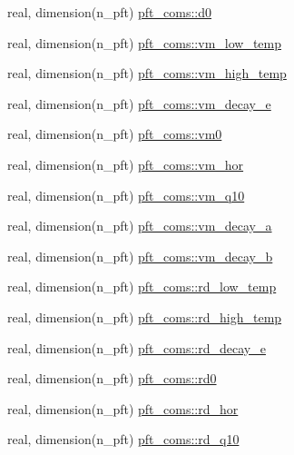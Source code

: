 \begin{DoxyCompactItemize}
real, dimension(n\+\_\+pft) \hyperlink{namespacepft__coms_aafd962aec98e7e8c1cfefd6543409bd5}{pft\+\_\+coms\+::d0}
\item 
real, dimension(n\+\_\+pft) \hyperlink{namespacepft__coms_abc805ab81f6ae61cf4ccfb36fd352fdc}{pft\+\_\+coms\+::vm\+\_\+low\+\_\+temp}
\item 
real, dimension(n\+\_\+pft) \hyperlink{namespacepft__coms_a847c455daab9b125944dd2057d418b6c}{pft\+\_\+coms\+::vm\+\_\+high\+\_\+temp}
\item 
real, dimension(n\+\_\+pft) \hyperlink{namespacepft__coms_a05c121e99b033c3fa874fc7ffd66fad3}{pft\+\_\+coms\+::vm\+\_\+decay\+\_\+e}
\item 
real, dimension(n\+\_\+pft) \hyperlink{namespacepft__coms_a80a6462c48a36d9c1ab7bcf0b6296702}{pft\+\_\+coms\+::vm0}
\item 
real, dimension(n\+\_\+pft) \hyperlink{namespacepft__coms_a1424943ac59ffe1e85af3d7eeca315bb}{pft\+\_\+coms\+::vm\+\_\+hor}
\item 
real, dimension(n\+\_\+pft) \hyperlink{namespacepft__coms_a47018d91ecb1fe0c547ec131348e5fdd}{pft\+\_\+coms\+::vm\+\_\+q10}
\item 
real, dimension(n\+\_\+pft) \hyperlink{namespacepft__coms_a2c9cb0165d22f8653900869b77019f4d}{pft\+\_\+coms\+::vm\+\_\+decay\+\_\+a}
\item 
real, dimension(n\+\_\+pft) \hyperlink{namespacepft__coms_a21f9c00aea9610811aae2469b5070c1b}{pft\+\_\+coms\+::vm\+\_\+decay\+\_\+b}
\item 
real, dimension(n\+\_\+pft) \hyperlink{namespacepft__coms_ad26dff15166122932a2a576c592451ba}{pft\+\_\+coms\+::rd\+\_\+low\+\_\+temp}
\item 
real, dimension(n\+\_\+pft) \hyperlink{namespacepft__coms_a1bcf4f8ef5012e5ea47b2e5deb6dae4a}{pft\+\_\+coms\+::rd\+\_\+high\+\_\+temp}
\item 
real, dimension(n\+\_\+pft) \hyperlink{namespacepft__coms_abc5e92f122fd2ebab52069105e512fa5}{pft\+\_\+coms\+::rd\+\_\+decay\+\_\+e}
\item 
real, dimension(n\+\_\+pft) \hyperlink{namespacepft__coms_a52c1f01cac447b99de69af116c709b08}{pft\+\_\+coms\+::rd0}
\item 
real, dimension(n\+\_\+pft) \hyperlink{namespacepft__coms_aa082b314a2092d3ee2b63f30cd1fc8be}{pft\+\_\+coms\+::rd\+\_\+hor}
\item 
real, dimension(n\+\_\+pft) \hyperlink{namespacepft__coms_ac49f4aa4c8e6b1ab0c02f40ac0c443bd}{pft\+\_\+coms\+::rd\+\_\+q10}
\item 

\end{DoxyCompactItemize}
